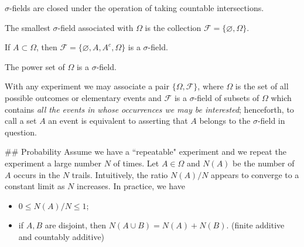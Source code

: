 \begin{remark}
$\sigma$-fields are closed under the operation of taking countable intersections.
\end{remark}

\begin{example}
The smallest $\sigma$-field associated with $\Omega$ is the collection $\mathcal{F} = \{\varnothing, \Omega \}$.
\end{example}

\begin{example}
If $A \subset \Omega$, then $\mathcal{F} = \{\varnothing, A, A^c, \Omega \}$ is a $\sigma$-field. 
\end{example}

\begin{example}
The power set of $\Omega$ is a $\sigma$-field.
\end{example}

With any experiment we may associate a pair $\{\Omega, \mathcal{F}\}$, where $\Omega$ is the set of all possible outcomes or elementary events and $\mathcal{F}$ is a $\sigma$-field of subsets of $\Omega$ which contains \emph{all the events in whose occurrences we may be interested}; henceforth, to call a set $A$ an event is equivalent to asserting that $A$ belongs to the $\sigma$-field in question. 


## Probability
Assume we have a ``repeatable" experiment and we repeat the experiment a large number $N$ of times. Let $A \in \Omega$ and $N(A)$ be the number of $A$ occurs in the $N$ trails. Intuitively, the ratio $N(A)/ N$ appears to converge to a constant limit as $N$ increases. In practice, we have 
\begin{itemize}
    \item $0 \leq N(A)/ N \leq 1$;
    \item if $A, B$ are disjoint, then $N(A \cup B) = N(A) + N(B)$. (finite additive and countably additive)
\end{itemize}

